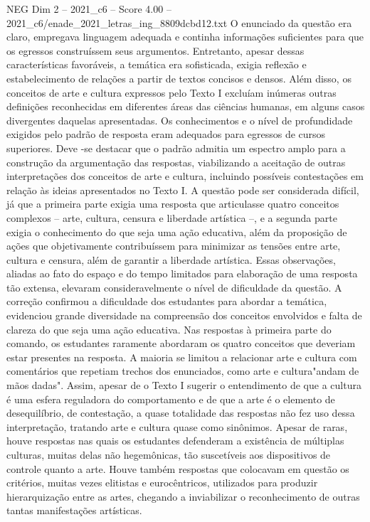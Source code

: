 \begin{textsample}{NEG Dim 2 – 2021\_c6 – Score 4.00 – 2021\_c6/enade\_2021\_letras\_ing\_8809dcbd12.txt}
O enunciado da questão era claro, empregava linguagem adequada e continha informações suficientes para que os egressos construíssem seus argumentos.
Entretanto, apesar dessas características favoráveis, a temática era sofisticada, exigia reflexão e estabelecimento de relações a partir de textos concisos e densos.
Além disso, os conceitos de arte e cultura expressos pelo Texto I excluíam inúmeras outras definições reconhecidas em diferentes áreas das ciências humanas, em alguns casos divergentes daquelas apresentadas.
Os conhecimentos e o nível de profundidade exigidos pelo padrão de resposta eram adequados para egressos de cursos superiores.
Deve -se destacar que o padrão admitia um espectro amplo para a construção da argumentação das respostas, viabilizando a aceitação de outras interpretações dos conceitos de arte e cultura, incluindo possíveis contestações em relação às ideias apresentados no Texto I.
A questão pode ser considerada difícil, já que a primeira parte exigia uma resposta que articulasse quatro conceitos complexos – arte, cultura, censura e liberdade artística –, e a segunda parte exigia o conhecimento do que seja uma ação educativa, além da proposição de ações que objetivamente contribuíssem para minimizar as tensões entre arte, cultura e censura, além de garantir a liberdade artística.
Essas observações, aliadas ao fato do espaço e do tempo limitados para elaboração de uma resposta tão extensa, elevaram consideravelmente o nível de dificuldade da questão.
A correção confirmou a dificuldade dos estudantes para abordar a temática, evidenciou grande diversidade na compreensão dos conceitos envolvidos e falta de clareza do que seja uma ação educativa.
Nas respostas à primeira parte do comando, os estudantes raramente abordaram os quatro conceitos que deveriam estar presentes na resposta.
A maioria se limitou a relacionar arte e cultura com comentários que repetiam trechos dos enunciados, como arte e cultura"andam de mãos dadas".
Assim, apesar de o Texto I sugerir o entendimento de que a cultura é uma esfera reguladora do comportamento e de que a arte é o elemento de desequilíbrio, de contestação, a quase totalidade das respostas não fez uso dessa interpretação, tratando arte e cultura quase como sinônimos.
Apesar de raras, houve respostas nas quais os estudantes defenderam a existência de múltiplas culturas, muitas delas não hegemônicas, tão suscetíveis aos dispositivos de controle quanto a arte.
Houve também respostas que colocavam em questão os critérios, muitas vezes elitistas e eurocêntricos, utilizados para produzir hierarquização entre as artes, chegando a inviabilizar o reconhecimento de outras tantas manifestações artísticas.

\end{textsample}
